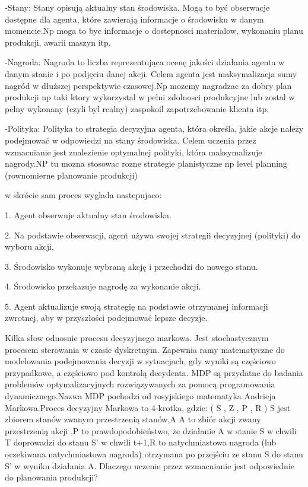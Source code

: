 -Stany: Stany opisują aktualny stan środowiska. Mogą to być obserwacje dostępne dla agenta, które zawierają informacje o środowisku w danym momencie.Np moga to byc informacje o dostepnosci materialow, wykonaniu planu produkcji, awarii maszyn itp.

-Nagroda: Nagroda to liczba reprezentująca ocenę jakości działania agenta w danym stanie i po podjęciu danej akcji. Celem agenta jest maksymalizacja sumy nagród w dłuższej perspektywie czasowej.Np mozemy nagradzac za dobry plan produkcji np taki ktory wykorzystal w pelni zdolnosci produkcyjne lub zostal w pelny wykonany (czyli byl realny) zaspokoil zapotrzebowanie klienta itp.

-Polityka: Polityka to strategia decyzyjna agenta, która określa, jakie akcje należy podejmować w odpowiedzi na stany środowiska. Celem uczenia przez wzmacnianie jest znalezienie optymalnej polityki, która maksymalizuje nagrody.NP tu mozna stosowac rozne strategie planistyczne np level planning (rownomierne planowanie produkcji)

w skrócie sam proces wyglada nastepujaco:
 \vspace{\baselineskip}
 
   1. Agent obserwuje aktualny stan środowiska.
   
   2. Na podstawie obserwacji, agent używa swojej strategii decyzyjnej (polityki) do wyboru akcji.
   
  3.  Środowisko wykonuje wybraną akcję i przechodzi do nowego stanu.
  
 4.   Środowisko przekazuje nagrodę za wykonanie akcji.
 
   5.  Agent aktualizuje swoją strategię na podstawie otrzymanej informacji zwrotnej, aby w przyszłości podejmować lepsze decyzje.
   \vspace{\baselineskip} 

   Kilka słow odnosnie procesu decyzyjnego markowa. Jest stochastycznym procesem sterowania w czasie dyskretnym. Zapewnia ramy matematyczne do modelowania podejmowania decyzji w sytuacjach, gdy wyniki są częściowo przypadkowe, a częściowo pod kontrolą decydenta. MDP są przydatne do badania problemów optymalizacyjnych rozwiązywanych za pomocą programowania dynamicznego.Nazwa MDP pochodzi od rosyjskiego matematyka Andrieja Markowa.Proces decyzyjny Markowa to 4-krotka, gdzie: ( S , Z , P  , R  ) S jest zbiorem stanów zwanym przestrzenią stanów,A A to zbiór akcji zwany przestrzenią akcji ,P to prawdopodobieństwo, że działanie A w stanie S w chwili T doprowadzi do stanu S' w chwili t+1,R to natychmiastowa nagroda (lub oczekiwana natychmiastowa nagroda) otrzymana po przejściu ze stanu S do stanu S' w wyniku działania A.
 \vspace{\baselineskip} 
Dlaczego uczenie przez wzmacnianie jest odpowiednie do planowania produkcji?



